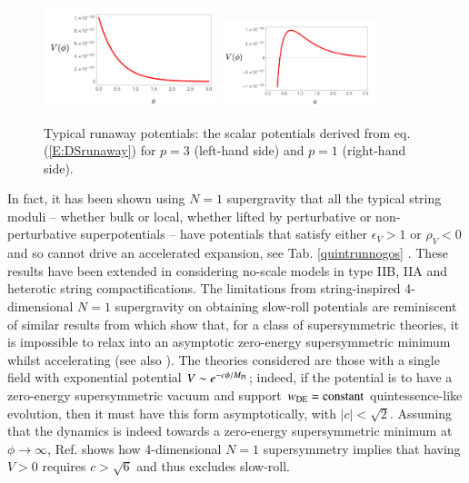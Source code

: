 \begin{figure}[ht]
\centering
\includegraphics[width = 0.45\textwidth]{Sections/Figures/Runaway1.pdf} \qquad\includegraphics[width = 0.4\textwidth]{Sections/Figures/Runaway2.pdf}
\caption{Typical runaway potentials: the scalar potentials derived from eq. (\ref{E:DSrunaway}) for $p=3$ (left-hand side) and $p=1$ (right-hand side).}
\label{F:runaways}
\end{figure}

In fact, it has been shown using $N=1$ supergravity that all the typical string moduli -- whether bulk or local, whether lifted by perturbative or non-perturbative superpotentials -- have potentials that satisfy either $\epsilon_V > 1$ or $\rho_V < 0$ and so cannot drive an accelerated expansion, see Tab. \ref{quintrunnogos} \cite{Bento:2020fxj}. These results have been extended in \cite{Cicoli:2021fsd} considering no-scale models in type IIB, IIA and heterotic string compactifications. The limitations from string-inspired 4-dimensional $N=1$ supergravity on obtaining slow-roll potentials are reminiscent of similar results from \cite{Hellerman:2001yi} which show that, for a class of supersymmetric theories, it is impossible to relax into an asymptotic zero-energy supersymmetric minimum whilst accelerating (see also \cite{Rudelius:2021azq}). The theories considered are those with a single field with exponential potential $V\sim e^{-c\phi/M_{\rm Pl}}$; indeed, if the potential is to have a zero-energy supersymmetric vacuum and support $w_{\rm DE}={\rm constant}$ quintessence-like evolution, then it must have this form asymptotically, with $|c|< \sqrt{2}$. Assuming that the dynamics is indeed towards a zero-energy supersymmetric minimum at $\phi \rightarrow \infty$, Ref. \cite{Hellerman:2001yi} shows how 4-dimensional $N=1$ supersymmetry implies that having $V>0$ requires $c > \sqrt{6}$ and thus excludes slow-roll.   


